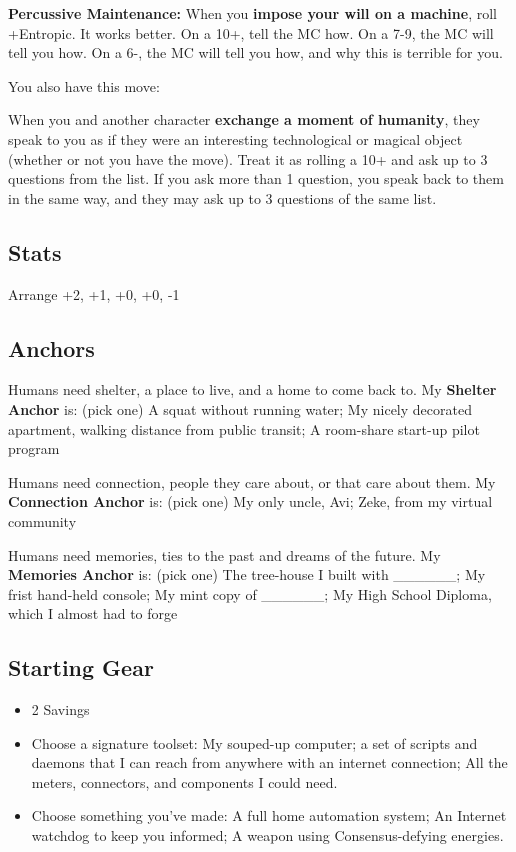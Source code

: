 \documentclass[10pt,twoside,openright]{memoir}
\begin{document}
\textbf{Percussive Maintenance:} When you \textbf{impose your will on a
machine}, roll +Entropic. It works better. On a 10+, tell the MC how. On
a 7-9, the MC will tell you how. On a 6-, the MC will tell you how, and
why this is terrible for you.

You also have this move:

When you and another character \textbf{exchange a moment of humanity},
they speak to you as if they were an interesting technological or
magical object (whether or not you have the move). Treat it as rolling a
10+ and ask up to 3 questions from the list. If you ask more than 1
question, you speak back to them in the same way, and they may ask up to
3 questions of the same list.

\hypertarget{stats-7}{%
\subsection{Stats}\label{stats-7}}

Arrange +2, +1, +0, +0, -1

\hypertarget{anchors-6}{%
\subsection{Anchors}\label{anchors-6}}

Humans need shelter, a place to live, and a home to come back to. My
\textbf{Shelter Anchor} is: (pick one) A squat without running water; My
nicely decorated apartment, walking distance from public transit; A
room-share start-up pilot program

Humans need connection, people they care about, or that care about them.
My \textbf{Connection Anchor} is: (pick one) My only uncle, Avi; Zeke,
from my virtual community

Humans need memories, ties to the past and dreams of the future. My
\textbf{Memories Anchor} is: (pick one) The tree-house I built with
\_\_\_\_\_\_; My frist hand-held console; My mint copy of \_\_\_\_\_\_;
My High School Diploma, which I almost had to forge

\hypertarget{starting-gear-6}{%
\subsection{Starting Gear}\label{starting-gear-6}}

\begin{itemize}
\tightlist
\item
  2 Savings
\item
  Choose a signature toolset: My souped-up computer; a set of scripts
  and daemons that I can reach from anywhere with an internet
  connection; All the meters, connectors, and components I could need.
\item
  Choose something you've made: A full home automation system; An
  Internet watchdog to keep you informed; A weapon using
  Consensus-defying energies.
\end{itemize}
\end{document}
